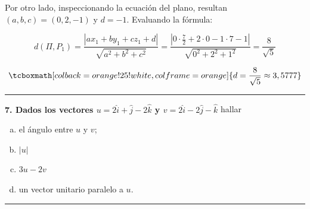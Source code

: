 \documentclass{article}
\begin{document}
Por otro lado, inspeccionando la ecuación del plano, resultan $(a, b, c) = (0, 2, -1)$ y $d = -1$. Evaluando la fórmula:

\begin{equation}
d(\Pi, P_1) = \frac{|a x_1 + b y_1 + c z_1 + d|}{\sqrt{a^2 + b^2 + c^2}} = \frac{|0 \cdot \frac{7}{2} + 2 \cdot 0 -1 \cdot 7 - 1 |}{\sqrt{0^2 + 2^2 + 1^2}} = \frac{8}{\sqrt{5}}
\end{equation}

\begin{equation}
\tcboxmath[colback=orange!25!white,colframe=orange]
{ d = \frac{8}{\sqrt{5}} \approx 3,5777 }
\end{equation}

\hrule
\vspace{10 pt}
\textbf{7. Dados los vectores $u = 2 \hat{i} + \hat{j} -2\hat{k}$ y $v = 2\hat{i} - 2\hat{j}-\hat{k}$} hallar 

\begin{enumerate}[(a)]
\bfseries
\item el ángulo entre $u$ y $v$;

\item $|u|$

\item $3u - 2v$

\item un vector unitario paralelo a $u$.
\end{enumerate}
\hrule
\end{document}
